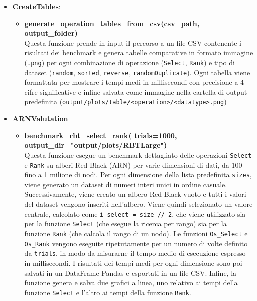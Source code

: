 \documentclass[10pt]{article}
\begin{document}
\begin{itemize}
\begin{itemize}
    \end{itemize}
    \item \textbf{CreateTables}:
    \begin{itemize}
    \item\textbf{generate\_operation\_tables\_from\_csv(csv\_path, output\_folder)}\\
    Questa funzione prende in input il percorso a un file CSV contenente i risultati dei benchmark e genera tabelle comparative in formato immagine (\texttt{.png}) per ogni combinazione di operazione (\texttt{Select}, \texttt{Rank}) e tipo di dataset (\texttt{random}, \texttt{sorted}, \texttt{reverse}, \texttt{randomDuplicate}). Ogni tabella viene formattata per mostrare i tempi medi in millisecondi con precisione a 4 cifre significative e infine salvata come immagine nella cartella di output predefinita \newline
    (\texttt{output/plots/table/<operation>/<datatype>.png})
    \end{itemize}
    \item \textbf{ARNValutation}
    \begin{itemize}
        \item \textbf{benchmark\_rbt\_select\_rank(
        \newline
        trials=1000, output\_dir="output/plots/RBTLarge")}\\
        Questa funzione esegue un benchmark dettagliato delle operazioni \texttt{Select} e \texttt{Rank} su alberi Red-Black (ARN) per varie dimensioni di dati, da 100 fino a 1 milione di nodi.
        Per ogni dimensione della lista predefinita \texttt{sizes}, viene generato un dataset di numeri interi unici in ordine casuale. Successivamente, viene creato un albero Red-Black vuoto e tutti i valori del dataset vengono inseriti nell’albero. Viene quindi selezionato un valore centrale, calcolato come \texttt{i\_select = size // 2}, che viene utilizzato sia per la funzione \texttt{Select} (che esegue la ricerca per rango) sia per la funzione \texttt{Rank} (che calcola il rango di un nodo). Le funzioni \texttt{Os\_Select} e \texttt{Os\_Rank} vengono eseguite ripetutamente per un numero di volte definito da \texttt{trials}, in modo da misurarne il tempo medio di esecuzione espresso in millisecondi. I risultati dei tempi medi per ogni dimensione sono poi salvati in un DataFrame Pandas e esportati in un file CSV. Infine, la funzione genera e salva due grafici a linea, uno relativo ai tempi della funzione \texttt{Select} e l’altro ai tempi della funzione \texttt{Rank}.
    \end{itemize}
\end{itemize}
\end{document}
